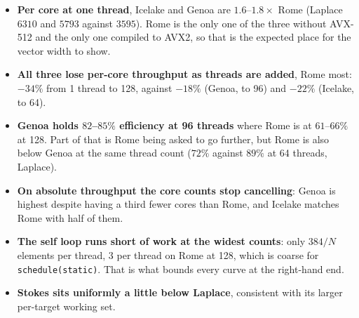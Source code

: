 \documentclass[11pt]{article}
\begin{document}
\begin{itemize}\setlength\itemsep{1pt}
\item \textbf{Per core at one thread}, Icelake and Genoa are $1.6$--$1.8\times$ Rome (Laplace
      $6310$ and $5793$ against $3595$). Rome is the only one of the three without AVX-512 and the
      only one compiled to AVX2, so that is the expected place for the vector width to show.
\item \textbf{All three lose per-core throughput as threads are added}, Rome most: $-34\%$ from 1
      thread to 128, against $-18\%$ (Genoa, to 96) and $-22\%$ (Icelake, to 64).
\item \textbf{Genoa holds $82$--$85\%$ efficiency at 96 threads} where Rome is at $61$--$66\%$ at
      128. Part of that is Rome being asked to go further, but Rome is also below Genoa at the
      same thread count ($72\%$ against $89\%$ at 64 threads, Laplace).
\item \textbf{On absolute throughput the core counts stop cancelling}: Genoa is highest despite
      having a third fewer cores than Rome, and Icelake matches Rome with half of them.
\item \textbf{The self loop runs short of work at the widest counts}: only $384/N$ elements per
      thread, 3 per thread on Rome at 128, which is coarse for \texttt{schedule(static)}. That
      is what bounds every curve at the right-hand end.
\item \textbf{Stokes sits uniformly a little below Laplace}, consistent with its larger per-target
      working set.
\end{itemize}
\end{document}
